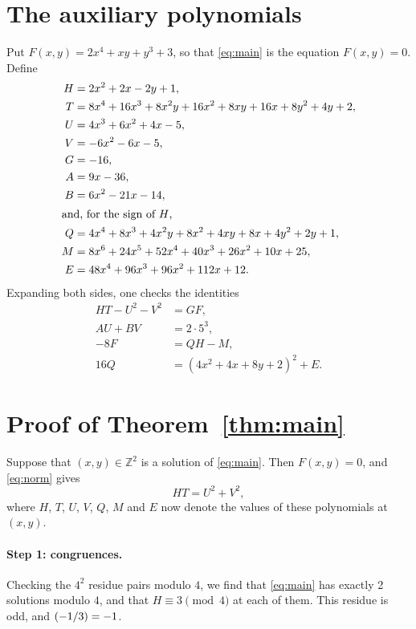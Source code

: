 \documentclass[11pt]{article}
\newcommand{\Z}{\mathbb{Z}}
\newcommand{\leg}[2]{\mathchoice{\biggl(\dfrac{#1}{#2}\biggr)}{(#1/#2)}{(#1/#2)}{(#1/#2)}}
\begin{document}
\section{The auxiliary polynomials}

Put $F(x,y)=2x^{4}+xy+y^{3}+3$, so that \eqref{eq:main} is the equation $F(x,y)=0$. Define
\begin{align*}
H&=2x^{2}+2x-2y+1,\\
T&=8x^{4}+16x^{3}+8x^{2}y+16x^{2}+8xy+16x+8y^{2}+4y+2,\\
U&=4x^{3}+6x^{2}+4x-5,\\
V&=-6x^{2}-6x-5,\\
G&=-16,\\
A&=9x-36,\\
B&=6x^{2}-21x-14,\\
\intertext{and, for the sign of $H$,}
Q&=4x^{4}+8x^{3}+4x^{2}y+8x^{2}+4xy+8x+4y^{2}+2y+1,\\
M&=8x^{6}+24x^{5}+52x^{4}+40x^{3}+26x^{2}+10x+25,\\
E&=48x^{4}+96x^{3}+96x^{2}+112x+12.
\end{align*}
Expanding both sides, one checks the identities
\begin{align}
HT-U^2-V^2&=GF,\label{eq:norm}\\
AU+BV&=2\cdot 5^{3},\label{eq:bezout}\\
-8F&=QH-M,\label{eq:sign}\\
16Q&=(4x^{2}+4x+8y+2)^2+E.\label{eq:sign2}
\end{align}

\section{Proof of Theorem~\ref{thm:main}}

Suppose that $(x,y)\in\Z^2$ is a solution of \eqref{eq:main}. Then $F(x,y)=0$, and \eqref{eq:norm} gives
\begin{equation}\label{eq:HT}
HT=U^2+V^2,
\end{equation}
where $H$, $T$, $U$, $V$, $Q$, $M$ and $E$ now denote the values of these polynomials at $(x,y)$.

\paragraph{Step 1: congruences.} Checking the $4^2$ residue pairs modulo $4$, we find that \eqref{eq:main} has exactly 2 solutions modulo $4$, and that $H\equiv3\pmod{4}$ at each of them. This residue is odd, and $\leg{-1}{3}=-1$.
\end{document}
